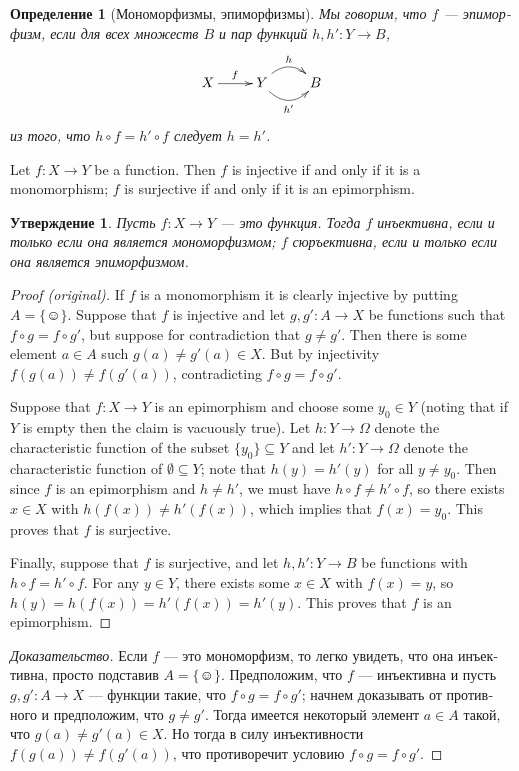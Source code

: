 \documentclass[a4paper]{book}
\def\singleton{\{\smiley\}}
\def\to{\rightarrow}
\def\taking{\colon}
\def\ss{\subseteq}
\theoremstyle{myth}
\newtheorem{propositionENG}[envENG]{\begin{english}Proposition\end{english}}
\newenvironment{proofENG}{\begin{proof}[Proof (original)]}{\end{proof}}
\newtheorem{propositionRUS}[envRUS]{Утверждение}
\newtheorem{definitionRUS}[envRUS]{Определение}
\newenvironment{proofRUS}{\begin{proof}[Доказательство]}{\end{proof}}
\begin{document}
\begin{russian}
\begin{definitionRUS}[Мономорфизмы, эпиморфизмы]
Мы говорим, что $f$ — {\em эпиморфизм}, если для всех множеств $B$ и пар функций $h,h'\taking Y\to B$, 
$$
\xymatrix{X\ar[r]^f&Y\ar@/^1pc/[r]^h\ar@/_1pc/[r]_{h'}&B}
$$
из того, что $h\circ f=h'\circ f$ следует $h=h'$.
\end{definitionRUS}

\begin{propositionENG}\label{prop:inj and surj}
Let $f\taking X\to Y$ be a function. Then $f$ is injective if and only if it is a monomorphism; $f$ is surjective if and only if it is an epimorphism.
\end{propositionENG}

\begin{propositionRUS}\label{prop:inj and surj}
Пусть $f\taking X\to Y$ — это функция. Тогда $f$ инъективна, если и только если она является мономорфизмом; $f$ сюръективна, если и только если она является эпиморфизмом.
\end{propositionRUS}

\begin{proofENG}
If $f$ is a monomorphism it is clearly injective by putting $A=\singleton$. Suppose that $f$ is injective and let $g,g'\taking A\to X$ be functions such that $f\circ g=f\circ g'$, but suppose for contradiction that $g\neq g'$. Then there is some element $a\in A$ such $g(a)\neq g'(a)\in X$. But by injectivity $f(g(a))\neq f(g'(a))$, contradicting $f\circ g=f\circ g'$.

Suppose that $f\taking X\to Y$ is an epimorphism and choose some $y_0\in Y$ (noting that if $Y$ is empty then the claim is vacuously true). Let $h\taking Y\to\Omega$ denote the characteristic function of the subset $\{y_0\}\ss Y$ and let $h'\taking Y\to\Omega$ denote the characteristic function of $\emptyset\ss Y$; note that $h(y)=h'(y)$ for all $y\neq y_0$. Then since $f$ is an epimorphism and $h\neq h'$, we must have $h\circ f\neq h'\circ f$, so there exists $x\in X$ with $h(f(x))\neq h'(f(x))$, which implies that $f(x)=y_0$. This proves that $f$ is surjective.

Finally, suppose that $f$ is surjective, and let $h,h'\taking Y\to B$ be functions with $h\circ f=h'\circ f$. For any $y\in Y$, there exists some $x\in X$ with $f(x)=y$, so $h(y)=h(f(x))=h'(f(x))=h'(y)$. This proves that $f$ is an epimorphism.
\end{proofENG}

\begin{proofRUS}
Если $f$ — это мономорфизм, то легко увидеть, что она инъективна, просто подставив $A=\singleton$. Предположим, что $f$ — инъективна и пусть $g,g'\taking A\to X$ — функции такие, что $f\circ g=f\circ g'$; начнем доказывать от противного и предположим, что $g\neq g'$. Тогда имеется некоторый элемент $a\in A$ такой, что $g(a)\neq g'(a)\in X$. Но тогда в силу инъективности $f(g(a))\neq f(g'(a))$, что противоречит условию $f\circ g=f\circ g'$.


\end{proofRUS}
\end{russian}
\end{document}
